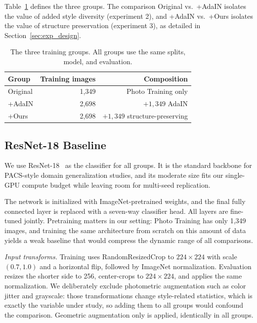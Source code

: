 Table~\ref{tab:groups} defines the three groups. The comparison Original vs.\ +AdaIN isolates the value of added style diversity (experiment 2), and +AdaIN vs.\ +Ours isolates the value of structure preservation (experiment 3), as detailed in Section~\ref{sec:exp_design}.

\begin{table}[t]
\caption{The three training groups. All groups use the same splits, model, and evaluation.}
\label{tab:groups}
\centering
\small
\setlength{\tabcolsep}{4pt}
\begin{tabular}{@{}lrr@{}}
\toprule
Group & Training images & Composition \\
\midrule
Original & 1{,}349 & Photo Training only \\
+AdaIN   & 2{,}698 & $+ 1{,}349$ AdaIN \\
+Ours    & 2{,}698 & $+ 1{,}349$ structure-preserving \\
\bottomrule
\end{tabular}
\end{table}


\subsection{ResNet-18 Baseline}
\label{sec:resnet_baseline}

We use ResNet-18~\cite{he2016resnet} as the classifier for all groups. It is the standard backbone for PACS-style domain generalization studies, and its moderate size fits our single-GPU compute budget while leaving room for multi-seed replication.

The network is initialized with ImageNet-pretrained weights, and the final fully connected layer is replaced with a seven-way classifier head. All layers are fine-tuned jointly. Pretraining matters in our setting: Photo Training has only 1{,}349 images, and training the same architecture from scratch on this amount of data yields a weak baseline that would compress the dynamic range of all comparisons.

\textit{Input transforms.} Training uses RandomResizedCrop to $224\times224$ with scale $(0.7, 1.0)$ and a horizontal flip, followed by ImageNet normalization. Evaluation resizes the shorter side to 256, center-crops to $224\times224$, and applies the same normalization. We deliberately exclude photometric augmentation such as color jitter and grayscale: those transformations change style-related statistics, which is exactly the variable under study, so adding them to all groups would confound the comparison. Geometric augmentation only is applied, identically in all groups.

